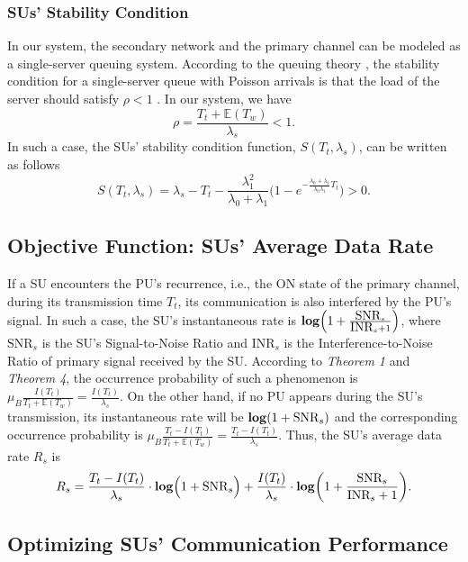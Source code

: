 \documentclass[11pt,draftcls]{IEEEtran}{\onecolumn}
\begin{document}
\subsubsection{SUs' Stability Condition}\label{stability}
In our system, the secondary network and the primary channel can be
modeled as a single-server queuing system. According to the queuing
theory \cite{queuing}, the stability condition for a single-server
queue with Poisson arrivals is that the load of the server should
satisfy $\rho < 1$ \cite{32}. In our system, we have
\begin{equation}
\rho=\frac{T_t+\mathbb E(T_w)}{\lambda_s} < 1.
\end{equation}
In such a case, the SUs' stability condition function,
$S(T_t,\lambda_s)$, can be written as follows
\begin{equation}
S(T_t,\lambda_s)=\lambda_s-T_t-\frac{\lambda_1^2}{\lambda_0+\lambda_1}
\Big(1-e^{-\frac{\lambda_0+\lambda_1}{\lambda_0\lambda_1}T_t}\Big) >0.\label{stable}
\end{equation}

\subsection{Objective Function: SUs' Average Data Rate}
If a SU encounters the PU's recurrence, i.e., the ON state of the
primary channel, during its transmission time $T_t$, its
communication is also interfered by the PU's signal. In such a case,
the SU's instantaneous rate is
$\mbox{\textbf{log}}\Big(1+\frac{\mbox{SNR}_s}{\mbox{INR}_s+1}\Big)$,
where $\mbox{SNR}_s$ is the SU's Signal-to-Noise Ratio and
$\mbox{INR}_s$ is the Interference-to-Noise Ratio of primary signal
received by the SU. According to \emph{Theorem 1} and \emph{Theorem
4}, the occurrence probability of such a phenomenon is
$\mu_B\frac{I(T_t)}{T_t+\mathbb{E}(T_w)} =\frac{I(T_t)}{\lambda_s}$.
On the other hand, if no PU appears during the SU's transmission,
its instantaneous rate will be $\mbox{\textbf{log}}(1+\mbox{SNR}_s)$
and the corresponding occurrence probability is
$\mu_B\frac{T_t-I(T_t)}{T_t+\mathbb{E}(T_w)}
=\frac{T_t-I(T_t)}{\lambda_s}$. Thus, the SU's average data rate
$R_s$ is
\begin{equation} R_s=
\frac{T_t-I(T_t)}{\lambda_s}\cdot\mbox{\textbf{log}}\Big(1+\mbox{SNR}_s\Big)
+\frac{I(T_t)}{\lambda_s}\cdot\mbox{\textbf{log}}\bigg(1+\frac{\mbox{SNR}_s}{\mbox{INR}_s+1}\bigg).\label{rs}
\end{equation}

\subsection{Optimizing SUs' Communication Performance}
\end{document}
